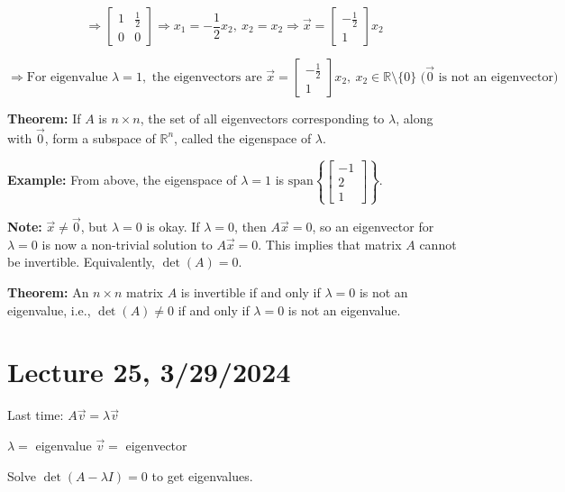 \documentclass{article}
\begin{document}
\[
\Rightarrow \begin{bmatrix} 1 & \frac{1}{2} \\ 0 & 0 \end{bmatrix} \Rightarrow x_1 = -\frac{1}{2}x_2, \ x_2 = x_2 \Rightarrow \vec{x} = \begin{bmatrix} -\frac{1}{2} \\ 1 \end{bmatrix}x_2 \]

\[
\Rightarrow \text{For eigenvalue } \lambda = 1, \text{ the eigenvectors are } \vec{x} = \begin{bmatrix} -\frac{1}{2} \\ 1 \end{bmatrix}x_2, \ x_2 \in \mathbb{R} \setminus \{0\} \text{ (}\vec{0} \text{ is not an eigenvector)}
\]


\textbf{Theorem:} If \( A \) is \( n \times n \), the set of all eigenvectors corresponding to \( \lambda \), along with \( \vec{0} \), form a subspace of \( \mathbb{R}^n \), called the eigenspace of \( \lambda \).

\textbf{Example:} From above, the eigenspace of \( \lambda = 1 \) is \( \text{span}\left\{ \begin{bmatrix} -1 \\ 2 \\ 1 \end{bmatrix} \right\} \).

\textbf{Note:} \( \vec{x} \neq \vec{0} \), but \( \lambda = 0 \) is okay. If \( \lambda = 0 \), then \( A\vec{x} = 0 \), so an eigenvector for \( \lambda = 0 \) is now a non-trivial solution to \( A\vec{x} = 0 \). This implies that matrix \( A \) cannot be invertible. Equivalently, \( \det(A) = 0 \).

\textbf{Theorem:} An \( n \times n \) matrix \( A \) is invertible if and only if \( \lambda = 0 \) is not an eigenvalue, i.e., \( \det(A) \neq 0 \) if and only if \( \lambda = 0 \) is not an eigenvalue.



\section{Lecture 25, 3/29/2024}

Last time: \( A\vec{v} = \lambda\vec{v} \)

\(\lambda = \) eigenvalue
\(\vec{v} = \) eigenvector

Solve \( \det(A-\lambda I) = 0 \) to get eigenvalues.
\end{document}
